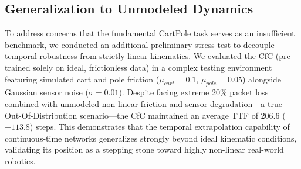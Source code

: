 \documentclass[conference]{IEEEtran}
\begin{document}
\subsection{Generalization to Unmodeled Dynamics}
\label{sec:generalization}
To address concerns that the fundamental CartPole task serves as an insufficient benchmark, we conducted an additional preliminary stress-test to decouple temporal robustness from strictly linear kinematics. We evaluated the CfC (pre-trained solely on ideal, frictionless data) in a complex testing environment featuring simulated cart and pole friction ($\mu_{cart}=0.1$, $\mu_{pole}=0.05$) alongside Gaussian sensor noise ($\sigma=0.01$). Despite facing extreme 20\% packet loss combined with unmodeled non-linear friction and sensor degradation—a true Out-Of-Distribution scenario—the CfC maintained an average TTF of 206.6 ($\pm 113.8$) steps. This demonstrates that the temporal extrapolation capability of continuous-time networks generalizes strongly beyond ideal kinematic conditions, validating its position as a stepping stone toward highly non-linear real-world robotics.
\end{document}
